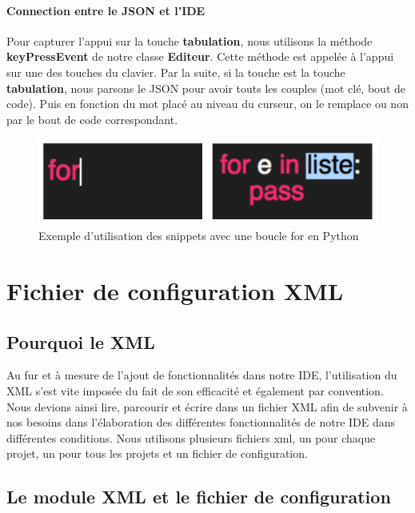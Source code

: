 \documentclass[a4paper,12pt]{article}
\begin{document}
		\paragraph{Connection entre le JSON et l'IDE}

			Pour capturer l'appui sur la touche \textbf{tabulation}, nous utilisons la méthode \textbf{keyPressEvent} de notre classe \textbf{Editeur}. Cette méthode est appelée à l'appui sur une des touches du clavier. Par la suite, si la touche est la touche \textbf{tabulation}, nous parsons le JSON pour avoir touts les couples (mot clé, bout de code). Puis en fonction du mot placé au niveau du curseur, on le remplace ou non par le bout de code correspondant.

			\begin{figure}[h!]
				\begin{center}
					\includegraphics[scale=0.7]{images/exampleFor}
					\caption{Exemple d'utilisation des snippets avec une boucle for en Python}
				\end{center}
			\end{figure}

\section{Fichier de configuration XML}

\subsection{Pourquoi le XML}

Au fur et à mesure de l'ajout de fonctionnalités dans notre IDE, l'utilisation du XML s'est vite imposée du fait de son efficacité et également par convention. Nous devions ainsi lire, parcourir et écrire dans un fichier XML afin de subvenir à nos besoins dans l'élaboration des différentes fonctionnalités de notre IDE dans différentes conditions. Nous utilisons plusieurs fichiers xml, un pour chaque projet, un pour tous les projets et un fichier de configuration.

\subsection{Le module XML et le fichier de configuration}
\end{document}
